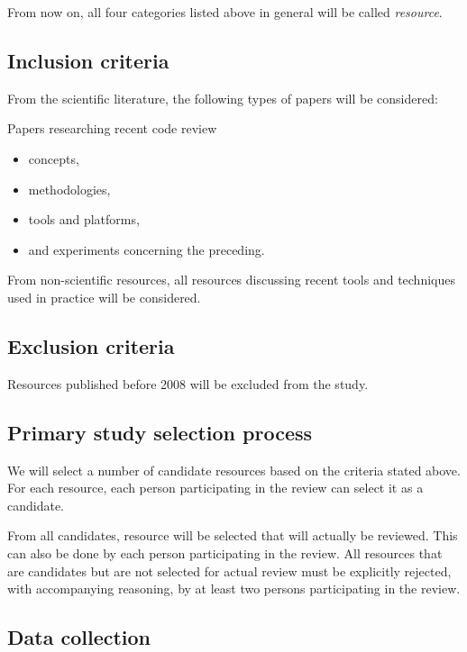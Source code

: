 \documentclass[]{book}
\providecommand{\tightlist}{%
  \setlength{\itemsep}{0pt}\setlength{\parskip}{0pt}}
\begin{document}
From now on, all four categories listed above in general will be called
\emph{resource}.

\subsection{Inclusion criteria}\label{inclusion-criteria}

From the scientific literature, the following types of papers will be
considered:

Papers researching recent code review

\begin{itemize}
\tightlist
\item
  concepts,
\item
  methodologies,
\item
  tools and platforms,
\item
  and experiments concerning the preceding.
\end{itemize}

From non-scientific resources, all resources discussing recent tools and
techniques used in practice will be considered.

\subsection{Exclusion criteria}\label{exclusion-criteria}

Resources published before 2008 will be excluded from the study.

\subsection{Primary study selection
process}\label{primary-study-selection-process}

We will select a number of candidate resources based on the criteria
stated above. For each resource, each person participating in the review
can select it as a candidate.

From all candidates, resource will be selected that will actually be
reviewed. This can also be done by each person participating in the
review. All resources that are candidates but are not selected for
actual review must be explicitly rejected, with accompanying reasoning,
by at least two persons participating in the review.

\subsection{Data collection}\label{data-collection}
\end{document}
